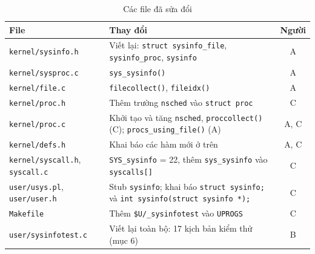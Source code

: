 \begin{table}[H]
\centering
\begin{tabularx}{\textwidth}{|l|>{\raggedright\arraybackslash}X|c|}
\hline
\textbf{File} & \textbf{Thay đổi} & \textbf{Người} \\ \hline
\texttt{kernel/sysinfo.h} & Viết lại: \texttt{struct sysinfo\_file}, \texttt{sysinfo\_proc}, \texttt{sysinfo} & A \\ \hline
\texttt{kernel/sysproc.c} & \texttt{sys\_sysinfo()} & A \\ \hline
\texttt{kernel/file.c} & \texttt{filecollect()}, \texttt{fileidx()} & A \\ \hline
\texttt{kernel/proc.h} & Thêm trường \texttt{nsched} vào \texttt{struct proc} & C \\ \hline
\texttt{kernel/proc.c} & Khởi tạo và tăng \texttt{nsched}, \texttt{proccollect()} (C); \texttt{procs\_using\_file()} (A) & A, C \\ \hline
\texttt{kernel/defs.h} & Khai báo các hàm mới ở trên & A, C \\ \hline
\texttt{kernel/syscall.h}, \texttt{syscall.c} & \texttt{SYS\_sysinfo} = 22, thêm \texttt{sys\_sysinfo} vào \texttt{syscalls[]} & C \\ \hline
\texttt{user/usys.pl}, \texttt{user/user.h} & Stub \texttt{sysinfo}; khai báo \texttt{struct sysinfo;} và \texttt{int sysinfo(struct sysinfo *);} & C \\ \hline
\texttt{Makefile} & Thêm \texttt{\$U/\_sysinfotest} vào \texttt{UPROGS} & C \\ \hline
\texttt{user/sysinfotest.c} & Viết lại toàn bộ: 17 kịch bản kiểm thử (mục 6) & B \\ \hline
\end{tabularx}
\caption{Các file đã sửa đổi}
\end{table}
